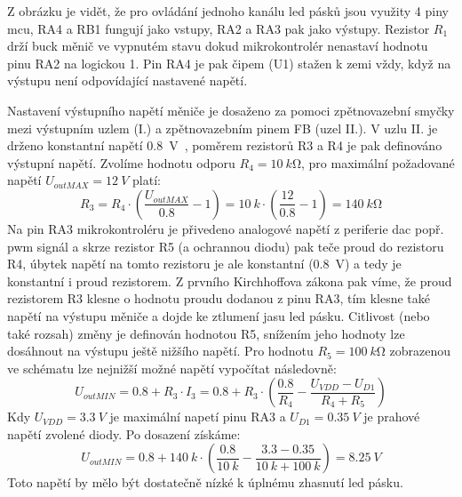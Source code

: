     Z obrázku je vidět, že pro ovládání jednoho kanálu \acs{led} pásků jsou využity 4 piny \acs{mcu}, RA4 a RB1 fungují jako vstupy, RA2 a RA3 pak jako výstupy. Rezistor \(R_{1}\) drží buck měnič ve vypnutém stavu dokud mikrokontrolér nenastaví hodnotu pinu RA2 na logickou 1. Pin RA4 je pak čipem (U1) stažen k zemi vždy, když na výstupu není odpovídající nastavené napětí.  
    
    Nastavení výstupního napětí měniče je dosaženo za pomoci zpětnovazební smyčky mezi výstupním uzlem (I.) a zpětnovazebním pinem FB (uzel II.). V uzlu II. je drženo konstantní napětí \qty{0.8}{V}~\cite{Diodes_AP63356Q}, poměrem rezistorů R3 a R4 je pak definováno výstupní napětí. Zvolíme hodnotu odporu \(R_{4} = \qty{10}{k\ohm}\), pro maximální požadované napětí \(U_{outMAX} = \qty{12}{V}\) platí:
    \begin{equation}
        R_{3} = R_{4}\cdot \left(\frac{U_{outMAX} }{\num{0.8}}-1\right) = \qty{10}{k}\cdot \left(\frac{12}{\num{0.8}}-1\right) = \qty{140}{k\ohm}
    \end{equation} 
    Na pin RA3 mikrokontroléru je přivedeno analogové napětí z periferie \acs{dac} popř. \acs{pwm} signál a skrze rezistor R5 (a ochrannou diodu) pak teče proud do rezistoru R4, úbytek napětí na tomto rezistoru je ale konstantní (\qty{0.8}{V}) a tedy je konstantní i proud rezistorem. Z prvního Kirchhoffova zákona pak víme, že proud rezistorem R3 klesne o hodnotu proudu dodanou z pinu RA3, tím klesne také napětí na výstupu měniče a dojde ke ztlumení jasu \acs{led} pásku. Citlivost (nebo také rozsah) změny je definován hodnotou R5, snížením jeho hodnoty lze dosáhnout na výstupu ještě nižšího napětí. Pro hodnotu \(R_{5} = \qty{100}{k\ohm}\) zobrazenou ve schématu lze nejnižší možné napětí vypočítat následovně:
    \begin{equation}
        U_{outMIN} = \num{0.8}+R_{3} \cdot I_{3} = \num{0.8}+R_{3} \cdot \left(\frac{\num{0.8}}{R_{4}} - \frac{U_{VDD} - U_{D1}}{R_{4}+R_{5}} \right) 
    \end{equation}  
    Kdy \(U_{VDD} = \qty{3.3}{V}\) je maximální napetí pinu RA3 a \(U_{D1}=\qty{0.35}{V} \) je prahové napětí zvolené diody. Po dosazení získáme:
    \begin{equation}
        U_{outMIN} = \num{0.8}+\qty{140}{k} \cdot \left(\frac{\num{0.8}}{\qty{10}{k}} - \frac{\num{3.3} - \num{0.35}}{\qty{10}{k}+\qty{100}{k}} \right) = \qty{8.25}{V}
    \end{equation}  
    Toto napětí by mělo být dostatečně nízké k úplnému zhasnutí \acs{led} pásku.

